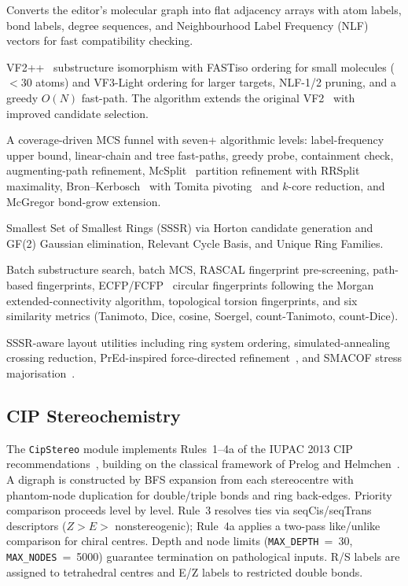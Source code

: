 \documentclass[twocolumn]{article}
\begin{document}
\begin{description}[nosep,leftmargin=1em]
\item[\texttt{SmsdGraph}] Converts the editor's molecular graph into
  flat adjacency arrays with atom labels, bond labels, degree sequences,
  and Neighbourhood Label Frequency (NLF) vectors for fast
  compatibility checking.
\item[\texttt{SmsdVF2}] VF2++~\citep{Juttner2018} substructure
  isomorphism with FASTiso ordering for small molecules ($<$30 atoms)
  and VF3-Light ordering for larger targets, NLF-1/2 pruning, and a
  greedy $O(N)$ fast-path.  The algorithm extends the original
  VF2~\citep{Cordella2004} with improved candidate selection.
\item[\texttt{SmsdMCS}] A coverage-driven MCS funnel with seven+
  algorithmic levels: label-frequency upper bound, linear-chain and tree
  fast-paths, greedy probe, containment check, augmenting-path
  refinement, McSplit~\citep{McCreesh2017} partition refinement with
  RRSplit maximality, Bron--Kerbosch~\citep{Bron1973} with
  Tomita pivoting~\citep{Tomita2006} and $k$-core reduction, and
  McGregor bond-grow extension.
\item[\texttt{SmsdRings}] Smallest Set of Smallest Rings (SSSR)
  via Horton candidate generation and GF(2) Gaussian elimination,
  Relevant Cycle Basis, and Unique Ring Families.
\item[\texttt{SmsdBatch}] Batch substructure search, batch MCS, RASCAL
  fingerprint pre-screening, path-based fingerprints,
  ECFP/FCFP~\citep{Rogers2010} circular fingerprints following the
  Morgan~\citep{Morgan1965} extended-connectivity algorithm,
  topological torsion fingerprints, and six
  similarity metrics (Tanimoto, Dice, cosine, Soergel, count-Tanimoto,
  count-Dice).
\item[\texttt{SmsdLayout}] SSSR-aware layout utilities including ring
  system ordering, simulated-annealing crossing reduction, PrEd-inspired
  force-directed refinement~\citep{Bertault2000}, and SMACOF stress
  majorisation~\citep{deLeeuw1977}.
\end{description}

\subsection{CIP Stereochemistry}

The \texttt{CipStereo} module implements Rules~1--4a of the IUPAC 2013
CIP recommendations~\citep{Favre2013}, building on the classical
framework of Prelog and Helmchen~\citep{Prelog1982}.  A digraph is
constructed by BFS expansion from each stereocentre with phantom-node
duplication for double/triple bonds and ring back-edges.  Priority
comparison proceeds level by level.  Rule~3 resolves ties via
seqCis/seqTrans descriptors ($Z > E > $ nonstereogenic); Rule~4a applies
a two-pass like/unlike comparison for chiral centres.  Depth and node
limits (\texttt{MAX\_DEPTH}~=~30, \texttt{MAX\_NODES}~=~5000) guarantee
termination on pathological inputs.  R/S labels are assigned to
tetrahedral centres and E/Z labels to restricted double bonds.
\end{document}

